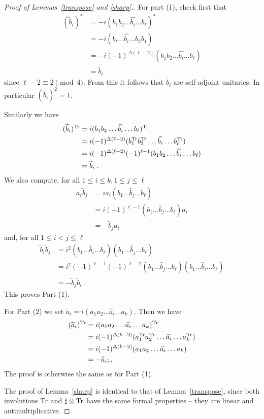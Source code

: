 \documentclass[12pt, reqno]{amsart}
\theoremstyle{definition}
\def\T{{\mathbb T}}
\def\T{ ^{\rm{Tr}}}
\begin{document}
\begin{proof}[Proof of Lemmas~\ref{transpose} and \ref{sharp}.]
For part (1), check first that
\begin{align*}
(\widetilde b_i)^* &= -i (b_1 b_2 \dots \widehat{b_i} \dots b_\ell)^* \\
	&= -i (b_\ell \dots \widehat{b_i} \dots b_2 b_1) \\
	&= -i (-1)^{\Delta(\ell-2)} (b_1 b_2 \dots \widehat{b_i} \dots b_\ell) \\
	&= \widetilde b_i 
\end{align*}
since $\ell-2 \equiv 2 \pmod 4$. From this it follows that $\widetilde b_i$ are self-adjoint unitaries. In particular $(\widetilde b_i)^2 = 1$.

Similarly we have
\begin{align*}
(\widetilde b_i)\T &=  i (b_1 b_2 \dots \widehat{b_i} \dots b_\ell)\T \\
	& = i (-1)^{\Delta(\ell-2)} (b_1\T b_2\T \dots \widehat{b_i} \dots b_\ell\T) \\
	&= i (-1)^{\Delta(\ell-2)} (-1)^{\ell-1} (b_1 b_2 \dots \widehat{b_i} \dots b_\ell) \\
	&= \widetilde b_i \; .
\end{align*}
We also compute, for all $1 \leq i \leq k, 1 \leq j \leq \ell$
\begin{align*}
a_i \widetilde b_j &= i a_i (b_1 \dots \widehat{b}_j \dots b_\ell) \\
	&= i (-1)^{\ell-1} (b_1 \dots \widehat{b}_j \dots b_\ell) a_i \\
	&= - \widetilde b_j a_i
\end{align*}
and, for all $1 \leq i < j \leq \ell$
\begin{align*}
\widetilde b_i \widetilde b_j 
	&= i^2 (b_1 \dots \widehat{b}_i \dots b_\ell)(b_1 \dots \widehat{b}_j \dots b_\ell) \\
	&= i^2 (-1)^{\ell-1} (-1)^{\ell-2} (b_1 \dots \widehat{b}_j \dots b_\ell)(b_1 \dots \widehat{b}_i \dots b_\ell) \\
	&= - \widetilde b_j \widetilde b_i \; .
\end{align*}
This proves Part (1).

For Part (2) we set $\widetilde a_i = i (a_1 a_2 \dots \widehat a _i \dots a_k)$. 
Then we have 
\begin{align*}
(\widetilde a_i)\T &=  i (a_1 a_2 \dots \widehat{a_i} \dots a_k)\T \\
	& = i (-1)^{\Delta(k-2)} (a_1\T a_2\T \dots \widehat{a_i} \dots a_k\T) \\
	&= i (-1)^{\Delta(k-2)}  (a_1 a_2 \dots \widehat{a_i} \dots a_k) \\
	&= - \widetilde a_i; .
\end{align*}
The proof is otherwise the same  as for Part (1). 

The proof of Lemma~\ref{sharp} is identical to that of Lemma~\ref{transpose}, since both involutions ${\rm Tr}$ and $\sharp \otimes {\rm Tr}$ have the same formal properties -- they are linear and antimultiplicative.
\end{proof}
\end{document}
